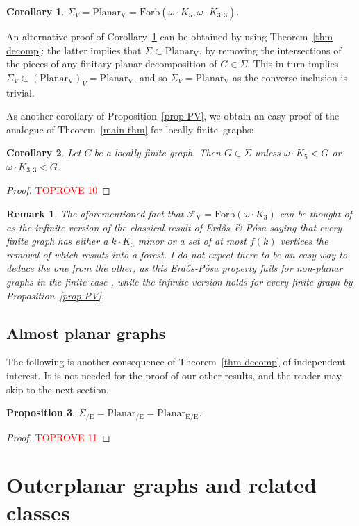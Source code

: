\documentclass{article}
\newtheorem{remark}{Remark}
\newcommand{\forb}[1]{\mathrm{Forb}(#1)}
\newcommand{\pln}{\ensuremath{\mathrm{Planar}}}
\newcommand{\plV}{\ensuremath{\mathrm{Planar_V}}}
\newcommand{\frs}{\mathcal{F}}
\newcommand{\frsV}{\frs_\mathrm{V}}
\newcommand{\rmce}[1]{\ensuremath{#1_{\mathrm{/E}}}}
\newcommand{\rmece}[1]{\ensuremath{#1_{\mathrm{E/E}}}}
\newcommand{\Sig}{\ensuremath{\Sigma}}
\newcommand{\omdot}{\omega \cdot}
\newtheorem{proposition}{Proposition}[section]
\newtheorem{corollary}[proposition]{Corollary}
\newcommand{\g}{\ensuremath{G\ }}
\newcommand{\Ktt}{\ensuremath{K_{3,3}}}
\newcommand{\Tr}[1]{Theorem~\ref{#1}}
\newcommand{\Prr}[1]{Pro\-position~\ref{#1}}
\newcommand{\Cr}[1]{Corollary~\ref{#1}}
\newcommand{\lf}{locally finite}
\newcommand{\Erd}{Erd\H{o}s}
\begin{document}
\begin{corollary} \label{cor sigV}
$\Sig_V=\plV=\forb{\omdot K_5, \omdot \Ktt}$.
\end{corollary}
An alternative proof of \Cr{cor sigV} can be obtained by using \Tr{thm decomp}: the latter implies that $\Sig \subset \plV$, by removing the intersections of the pieces of any finitary planar decomposition of $G\in \Sig$. This in turn implies $\Sig_V \subset (\plV)_V = \plV$, and so  $\Sig_V=\plV$ as the converse inclusion is trivial.


\medskip
As another corollary of \Prr{prop PV}, we obtain an easy proof of the analogue of \Tr{main thm} for \lf\ graphs:
\begin{corollary} \label{cor lf}
Let \g be a locally finite graph. Then $G\in \Sig$ unless 
$\omdot K_5 < G$ or $\omdot \Ktt<G$.
\end{corollary}
\begin{proof}\textcolor{red}{TOPROVE 10}\end{proof}


\begin{remark}
\textup{The aforementioned fact that $\frsV= \forb{\omdot K_3}$ can be thought of as the infinite version of the classical result of \Erd\ \& P\'osa \cite{ErdPosInd} saying that every finite graph has either a $k\cdot K_3$ minor or a set of at most $f(k)$ vertices the removal of which results into a forest. I do not expect there to be an easy way to deduce the one from the other, as this \Erd-P\'osa property fails for non-planar graphs in the finite case \cite{GMV}, while the infinite version holds for every finite graph by \Prr{prop PV}}.
\end{remark}

\subsection{Almost planar graphs} \label{sec AP}

The following is another consequence of \Tr{thm decomp} of independent interest. It is not needed for the proof of our other results, and the reader may skip to the next section. 
\begin{proposition} \label{prop AP}
$\rmce{\Sig} = \rmce{\pln} =\rmece{\pln}$.
\end{proposition}
\begin{proof}\textcolor{red}{TOPROVE 11}\end{proof}



\section{Outerplanar graphs and related classes} \label{sec UOP}
\end{document}
